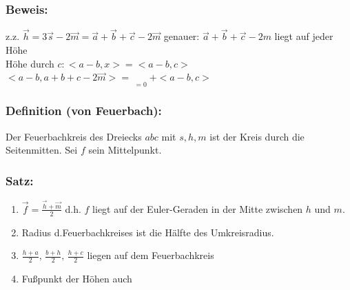 \subsubsection{Beweis:}
z.z. $\vec{h}=3\vec{s}-2\vec{m}=\vec{a}+\vec{b}+\vec{c}-2\vec{m}$
genauer: $\vec{a}+\vec{b}+\vec{c}-2m$ liegt auf jeder Höhe\\
Höhe durch $c: <a-b,x>=<a-b,c>$\\
$<a-b,a+b+c-2\vec{m}>=\mathop{\underbrace{<a-b,a+b>-<a-b,2\vec{m}>}}\limits_{=0}+<a-b,c>$
%
%
%
\subsubsection{Definition (von Feuerbach):}
Der Feuerbachkreis des Dreiecks $abc$ mit $s,h,m$ ist der Kreis durch die Seitenmitten. Sei $f$ sein Mittelpunkt.\\
%
%
\subsubsection{Satz:}
\begin{enumerate}
	\item $\vec{f}=\frac{\vec{h}+\vec{m}}{2}$ d.h. $f$ liegt auf der Euler-Geraden in der 
	Mitte zwischen $h$ und $m$.
	\item Radius d.Feuerbachkreises ist die Hälfte des Umkreisradius. 
	\item $\frac{h+a}{2} , \, \frac{b+h}{2}, \, \frac{h+c}{2}$ liegen auf dem Feuerbachkreis
	\item Fußpunkt der Höhen auch
\end{enumerate}
%
%
%
